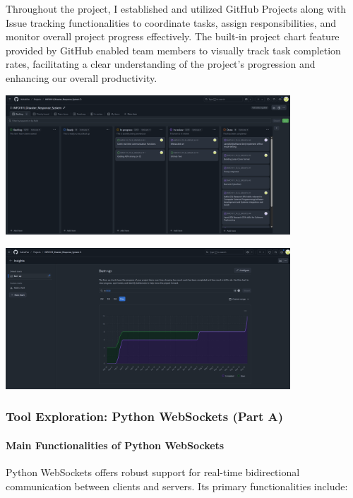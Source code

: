 \documentclass[a4paper, 11pt]{report}
\begin{document}
Throughout the project, I established and utilized GitHub Projects along with Issue tracking functionalities to coordinate tasks, assign responsibilities, and monitor overall project progress effectively. The built-in project chart feature provided by GitHub enabled team members to visually track task completion rates, facilitating a clear understanding of the project's progression and enhancing our overall productivity.

\begin{center}
\includegraphics[width=0.8\textwidth]{kaffa/issue.png}
\end{center}

\begin{center}
\includegraphics[width=0.8\textwidth]{kaffa/line chart.png}
\end{center}

\subsubsection{Tool Exploration: Python WebSockets (Part A)}

\paragraph{Main Functionalities of Python WebSockets}

Python WebSockets offers robust support for real-time bidirectional communication between clients and servers. Its primary functionalities include:
\end{document}
